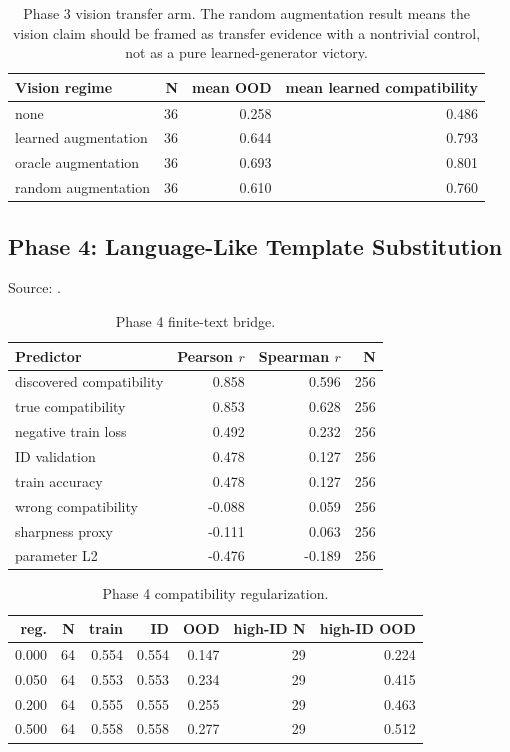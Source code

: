 \begin{table}[h]
\centering
\small
\begin{tabular}{lrrr}
\toprule
Vision regime & N & mean OOD & mean learned compatibility \\
\midrule
none & 36 & 0.258 & 0.486 \\
learned augmentation & 36 & 0.644 & 0.793 \\
oracle augmentation & 36 & 0.693 & 0.801 \\
random augmentation & 36 & 0.610 & 0.760 \\
\bottomrule
\end{tabular}
\caption{Phase 3 vision transfer arm. The random augmentation result means the
vision claim should be framed as transfer evidence with a nontrivial control,
not as a pure learned-generator victory.}
\end{table}

\subsection{Phase 4: Language-Like Template Substitution}

Source:
.

\begin{table}[h]
\centering
\small
\begin{tabular}{lrrr}
\toprule
Predictor & Pearson $r$ & Spearman $r$ & N \\
\midrule
discovered compatibility & 0.858 & 0.596 & 256 \\
true compatibility & 0.853 & 0.628 & 256 \\
negative train loss & 0.492 & 0.232 & 256 \\
ID validation & 0.478 & 0.127 & 256 \\
train accuracy & 0.478 & 0.127 & 256 \\
wrong compatibility & -0.088 & 0.059 & 256 \\
sharpness proxy & -0.111 & 0.063 & 256 \\
parameter L2 & -0.476 & -0.189 & 256 \\
\bottomrule
\end{tabular}
\caption{Phase 4 finite-text bridge.}
\end{table}

\begin{table}[h]
\centering
\small
\begin{tabular}{rrrrrrr}
\toprule
reg. & N & train & ID & OOD & high-ID N & high-ID OOD \\
\midrule
0.000 & 64 & 0.554 & 0.554 & 0.147 & 29 & 0.224 \\
0.050 & 64 & 0.553 & 0.553 & 0.234 & 29 & 0.415 \\
0.200 & 64 & 0.555 & 0.555 & 0.255 & 29 & 0.463 \\
0.500 & 64 & 0.558 & 0.558 & 0.277 & 29 & 0.512 \\
\bottomrule
\end{tabular}
\caption{Phase 4 compatibility regularization.}
\end{table}


